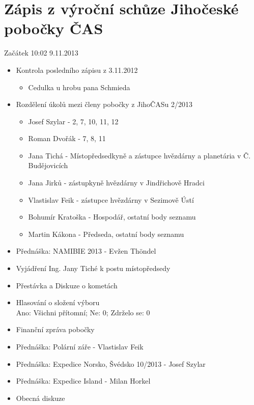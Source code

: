 \documentclass[11pt,a4paper]{article}
\begin{document}
\section{Zápis z výroční schůze Jihočeské pobočky ČAS}
Začátek 10:02 9.11.2013
\begin{itemize}
\item Kontrola posledního zápisu z 3.11.2012
	\begin{itemize}
	\item Cedulka u hrobu pana Schmieda 
	\end{itemize}
\item Rozdělení úkolů mezi členy pobočky z JihoČASu 2/2013
	\begin{itemize}
	\item Josef Szylar - 2, 7, 10, 11, 12
	\item Roman Dvořák - 7, 8, 11
	\item Jana Tichá - Místopředsedkyně a zástupce hvězdárny a planetária v Č. Budějovicích
	\item Jana Jirků - zástupkyně hvězdárny v Jindřichově Hradci
	\item Vlastislav Feik - zástupce hvězdárny v Sezimově Ústí
	\item Bohumír Kratoška - Hospodář, ostatní body seznamu
	\item Martin Kákona - Předseda, ostatní body seznamu
	\end{itemize}
\item Přednáška: NAMIBIE 2013 - Evžen Thöndel
\item Vyjádření Ing. Jany Tiché k postu místopředsedy
\item Přestávka a Diskuze o kometách
\item Hlasování o složení výboru \\  Ano: Všichni přítomní;  Ne: 0;  Zdrželo se: 0
\item Finanční zpráva pobočky
\item Přednáška: Polární záře - Vlastislav Feik
\item Přednáška: Expedice Norsko, Švédsko 10/2013 - Josef Szylar
\item Přednáška: Expedice Island - Milan Horkel
\item Obecná diskuze
\end{itemize}
\end{document}
